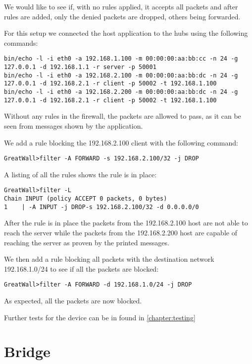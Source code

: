 We would like to see if, with no rules applied, it accepts all packets and after rules are added, only the denied packets
are dropped, others being forwarded.

For this setup we connected the host application to the hubs using the following commands:
\lstset{language=text, caption=Starting the hosts}
\begin{lstlisting}
bin/echo -l -i eth0 -a 192.168.1.100 -m 00:00:00:aa:bb:cc -n 24 -g 127.0.0.1 -d 192.168.1.1 -r server -p 50001
bin/echo -l -i eth0 -a 192.168.2.100 -m 00:00:00:aa:bb:dc -n 24 -g 127.0.0.1 -d 192.168.2.1 -r client -p 50002 -t 192.168.1.100
bin/echo -l -i eth0 -a 192.168.2.200 -m 00:00:00:aa:bb:dc -n 24 -g 127.0.0.1 -d 192.168.2.1 -r client -p 50002 -t 192.168.1.100
\end{lstlisting}
Without any rules in the firewall, the packets are allowed to pass, as it can be seen from messages shown by the application.

We add a rule blocking the 192.168.2.100 client with the following command:
\lstset{language=text, caption=Adding a rule}
\begin{lstlisting}
GreatWall>filter -A FORWARD -s 192.168.2.100/32 -j DROP
\end{lstlisting}
A listing of all the rules shows the rule is in place:
\lstset{language=text, caption=Listing the rules}
\begin{lstlisting}
GreatWall>filter -L
Chain INPUT (policy ACCEPT 0 packets, 0 bytes)
1	 | -A INPUT -j DROP-s 192.168.2.100/32 -d 0.0.0.0/0
\end{lstlisting}
After the rule is in place the packets from the 192.168.2.100 host are not able to reach the server while the packets from
the 192.168.2.200 host are capable of reaching the server as proven by the printed messages.

We then add a rule blocking all packets with the destination network 192.168.1.0/24 to see if all the packets are blocked:
\lstset{language=text, caption=Adding a rule}
\begin{lstlisting}
GreatWall>filter -A FORWARD -d 192.168.1.0/24 -j DROP
\end{lstlisting}
As expected, all the packets are now blocked.

Further tests for the device can be in found in \ref{chapter:testing}

\section{Bridge}

